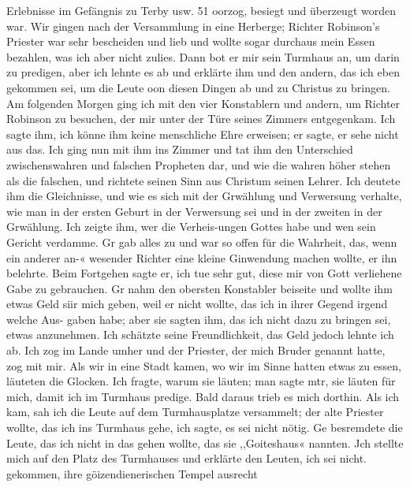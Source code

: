 Erlebnisse im Gefängnis zu Terby usw. 51
oorzog, besiegt und überzeugt worden war. Wir gingen nach
der Versammlung in eine Herberge; Richter Robinson’s Priester
war sehr bescheiden und lieb und wollte sogar durchaus mein
Essen bezahlen, was ich aber nicht zulies. Dann bot er mir sein
Turmhaus an, um darin zu predigen, aber ich lehnte es ab und
erklärte ihm und den andern, das ich eben gekommen sei, um die
Leute oon diesen Dingen ab und zu Christus zu bringen.
Am folgenden Morgen ging ich mit den vier Konstablern und
andern, um Richter Robinson zu besuchen, der mir unter der
Türe seines Zimmers entgegenkam. Ich sagte ihm, ich könne ihm
keine menschliche Ehre erweisen; er sagte, er sehe nicht aus das.
Ich ging nun mit ihm ins Zimmer und tat ihm den Unterschied
zwischenswahren und falschen Propheten dar, und wie die wahren
höher stehen als die falschen, und richtete seinen Sinn aus
Christum seinen Lehrer. Ich deutete ihm die Gleichnisse, und
wie es sich mit der Grwählung und Verwersung verhalte, wie
man in der ersten Geburt in der Verwersung sei und in der
zweiten in der Grwählung. Ich zeigte ihm, wer die Verheis-ungen
Gottes habe und wen sein Gericht verdamme. Gr gab alles zu
und war so offen für die Wahrheit, das, wenn ein anderer an-«
wesender Richter eine kleine Ginwendung machen wollte, er ihn
belehrte. Beim Fortgehen sagte er, ich tue sehr gut, diese mir
von Gott verliehene Gabe zu gebrauchen. Gr nahm den obersten
Konstabler beiseite und wollte ihm etwas Geld siir mich geben,
weil er nicht wollte, das ich in ihrer Gegend irgend welche Aus-
gaben habe; aber sie sagten ihm, das ich nicht dazu zu bringen
sei, etwas anzunehmen. Ich schätzte seine Freundlichkeit, das
Geld jedoch lehnte ich ab.
Ich zog im Lande umher und der Priester, der mich Bruder
genannt hatte, zog mit mir. Als wir in eine Stadt kamen, wo
wir im Sinne hatten etwas zu essen, läuteten die Glocken.
Ich fragte, warum sie läuten; man sagte mtr, sie läuten für mich,
damit ich im Turmhaus predige. Bald daraus trieb es mich
dorthin. Als ich kam, sah ich die Leute auf dem Turmhausplatze
versammelt; der alte Priester wollte, das ich ins Turmhaus gehe,
  ich sagte, es sei nicht nötig. Ge besremdete die Leute, das
ich nicht in das gehen wollte, das sie ,,Goiteshaus« nannten. Jch
stellte mich auf den Platz des Turmhauses und erklärte den Leuten,
ich sei nicht. gekommen, ihre göizendienerischen Tempel ausrecht
 


